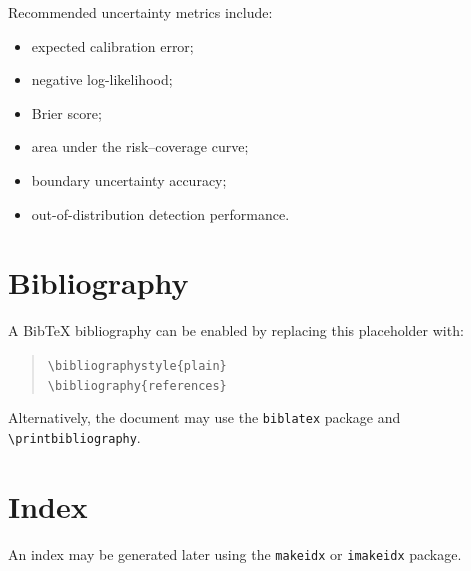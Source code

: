 \documentclass[11pt,oneside]{book}
\theoremstyle{remark}
\begin{document}
	Recommended uncertainty metrics include:
	
	\begin{itemize}
		\item expected calibration error;
		\item negative log-likelihood;
		\item Brier score;
		\item area under the risk--coverage curve;
		\item boundary uncertainty accuracy;
		\item out-of-distribution detection performance.
	\end{itemize}
	
	
	\backmatter
	
	\chapter*{Bibliography}
	
	A BibTeX bibliography can be enabled by replacing this placeholder with:
	
	\begin{quote}
		\texttt{\textbackslash bibliographystyle\{plain\}}\\
		\texttt{\textbackslash bibliography\{references\}}
	\end{quote}
	
	Alternatively, the document may use the \texttt{biblatex} package and
	\texttt{\textbackslash printbibliography}.
	
	\chapter*{Index}
	
	An index may be generated later using the \texttt{makeidx} or
	\texttt{imakeidx} package.
	
\end{document}
